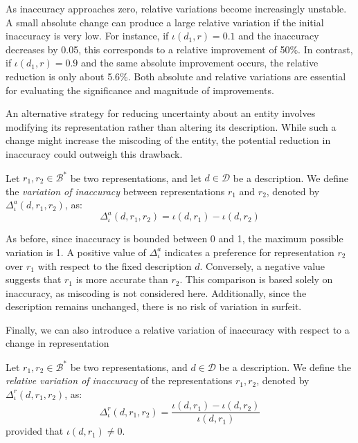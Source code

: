 As inaccuracy approaches zero, relative variations become increasingly unstable. A small absolute change can produce a large relative variation if the initial inaccuracy is very low. For instance, if $\iota(d_1, r) = 0.1$ and the inaccuracy decreases by 0.05, this corresponds to a relative improvement of 50\%. In contrast, if $\iota(d_1, r) = 0.9$ and the same absolute improvement occurs, the relative reduction is only about 5.6\%. Both absolute and relative variations are essential for evaluating the significance and magnitude of improvements.

An alternative strategy for reducing uncertainty about an entity involves modifying its representation rather than altering its description. While such a change might increase the miscoding of the entity, the potential reduction in inaccuracy could outweigh this drawback.

\begin{definition}
Let $r_1, r_2 \in \mathcal{B}^\ast$ be two representations, and let $d \in \mathcal{D}$ be a description. We define the \emph{variation of inaccuracy} between representations $r_1$ and $r_2$, denoted by $\Delta^{a}_{\iota}(d, r_1, r_2)$, as:
\[
\Delta^{a}_{\iota}(d, r_1, r_2) = \iota(d, r_1) - \iota(d, r_2)
\]
\end{definition}

As before, since inaccuracy is bounded between 0 and 1, the maximum possible variation is 1. A positive value of $\Delta^{a}_{\iota}$ indicates a preference for representation $r_2$ over $r_1$ with respect to the fixed description $d$. Conversely, a negative value suggests that $r_1$ is more accurate than $r_2$. This comparison is based solely on inaccuracy, as miscoding is not considered here. Additionally, since the description remains unchanged, there is no risk of variation in surfeit.

Finally, we can also introduce a relative variation of inaccuracy with respect to a change in representation

\begin{definition}
Let $r_1, r_2 \in \mathcal{B}^\ast$ be two representations, and $d \in \mathcal{D}$ be a description. We define the \emph{relative variation of inaccuracy} of the representations $r_1, r_2$, denoted by $\Delta^{r}_{\iota} ( d, r_1, r_2 )$, as:
\[
\Delta^{r}_{\iota} ( d, r_1, r_2 ) = \frac{\iota(d, r_1) - \iota(d, r_2)}{\iota(d, r_1)}
\]
provided that $\iota(d, r_1) \neq 0$.
\end{definition}

